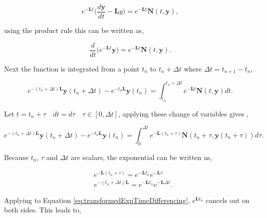 \begin{equation}
    e^{-\boldsymbol{L}t}\bigg( \frac{d\boldsymbol{y}}{dt}-\boldsymbol{L}y\bigg) = e^{-\boldsymbol{L}t}\boldsymbol{N}(t,\boldsymbol{y}),
\end{equation}

\noindent using the product rule this can be written as,

\begin{equation}
    \frac{d}{dt}\bigg(e^{-\boldsymbol{L}t}\boldsymbol{y}\bigg) = e^{-\boldsymbol{L}t}\boldsymbol{N}(t,\boldsymbol{y}).
\end{equation}

\noindent Next the function is integrated from a point $t_{n}$ to $t_{n} + \Delta t$ where $\Delta t = t_{n+1} - t_{n}$,

\begin{equation}
    e^{-(t_{n} + \Delta t)\boldsymbol{L}}\boldsymbol{y}(t_{n} + \Delta t) - e^{-t_{n}\boldsymbol{L}}\boldsymbol{y}(t_{n}) = \int_{t_{n}}^{t_{n}+\Delta t}e^{-\boldsymbol{L}t}\boldsymbol{N}(t,\boldsymbol{y})dt.
\end{equation}

\noindent Let $t = t_{n} + \tau \quad dt = d\tau \quad  \tau \in [0,\Delta t]$, applying these change of variables gives \cite{bratsos2015}, 

\begin{equation}
    e^{-(t_{n} + \Delta t)\boldsymbol{L}}\boldsymbol{y}(t_{n} + \Delta t) - e^{-t_{n}\boldsymbol{L}}\boldsymbol{y}(t_{n}) = \int_{0}^{\Delta t}e^{-\boldsymbol{L}(t_{n} + \tau)}\boldsymbol{N}(t_{n} + \tau,\boldsymbol{y}(t_{n} + \tau))d\tau.
    \label{eq:transformedExpTimeDifferencing}
\end{equation}

\noindent Because $t_{n}$,  $\tau$ and $\Delta t$ are scalars, the exponential can be written as,

\begin{equation}
\begin{split}
     & e^{-\boldsymbol{L}(t_{n}+\tau)} = e^{-\boldsymbol{L}t_{n}}e^{-\boldsymbol{L}\tau} \\ 
     & e^{-(t_{n}+\Delta t)\boldsymbol{L}} = e^{-\boldsymbol{L}t_{n}}e^{-\boldsymbol{L}\Delta t}.
\end{split}
\end{equation}

\noindent Applying to Equation \ref{eq:transformedExpTimeDifferencing}, $e^{\boldsymbol{L}t_{n}}$ cancels out on both sides. This leads to,

